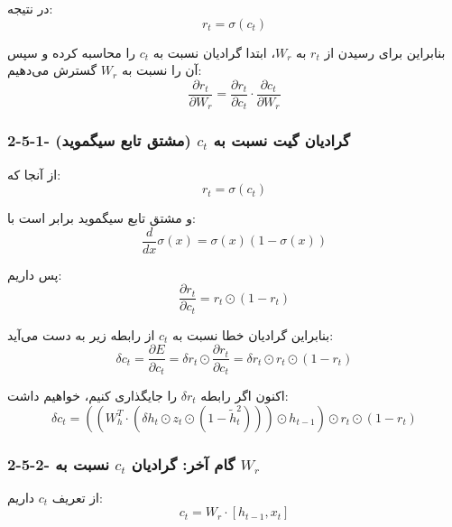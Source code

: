 \documentclass{article}
\begin{document}
در نتیجه:
\begin{equation}
	r_t=\sigma(c_t)
\end{equation}

بنابراین برای رسیدن از $r_t$ به $W_r$، ابتدا گرادیان نسبت به $c_t$ را محاسبه کرده و سپس آن را نسبت به $W_r$ گسترش می‌دهیم:
\begin{equation}
	\frac{\partial r_t}{\partial W_r}
	=
	\frac{\partial r_t}{\partial c_t}
	\cdot
	\frac{\partial c_t}{\partial W_r}
\end{equation}

\subsubsection{2-5-1- گرادیان گیت  نسبت به $c_t$ (مشتق تابع سیگموید)}
از آنجا که:
\begin{equation}
	r_t=\sigma(c_t)
\end{equation}

و مشتق تابع سیگموید برابر است با:
\begin{equation}
	\frac{d}{dx}\sigma(x)=\sigma(x)\left(1-\sigma(x)\right)
\end{equation}

پس داریم:
\begin{equation}
	\frac{\partial r_t}{\partial c_t}=r_t\odot(1-r_t)
\end{equation}

بنابراین گرادیان خطا نسبت به $c_t$ از رابطه زیر به دست می‌آید:
\begin{equation}
	\delta c_t
	=
	\frac{\partial E}{\partial c_t}
	=
	\delta r_t\odot\frac{\partial r_t}{\partial c_t}
	=
	\delta r_t\odot r_t\odot(1-r_t)
\end{equation}

اکنون اگر رابطه $\delta r_t$ را جایگذاری کنیم، خواهیم داشت:
\begin{equation}
	\delta c_t
	=
	\left(\left(W_h^T\cdot\left(\delta h_t\odot z_t\odot(1-\widetilde{h}_t^2)\right)\right)\odot h_{t-1}\right)\odot r_t\odot(1-r_t)
\end{equation}

\subsubsection{2-5-2- گام آخر: گرادیان $c_t$ نسبت به $W_r$}

از تعریف $c_t$ داریم:
\begin{equation}
	c_t=W_r\cdot[h_{t-1},x_t]
\end{equation}
\end{document}
